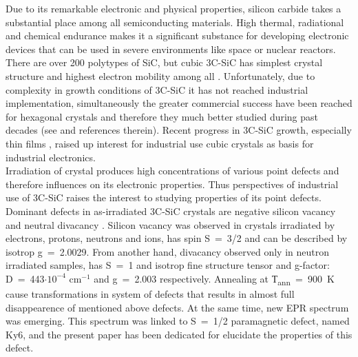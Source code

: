 Due to its remarkable electronic and physical properties, silicon carbide takes a substantial place among all semiconducting materials. High thermal, radiational and chemical endurance makes it a significant substance for developing electronic devices that can be used in severe environments like space or nuclear reactors.\\
\indent There are over 200 polytypes of SiC, but cubic 3C-SiC has simplest crystal structure and highest electron mobility among all \citep{choy1}. Unfortunately, due to complexity in growth conditions of 3C-SiC it has not reached industrial implementation, simultaneously the greater commercial success have been reached for hexagonal crystals and therefore they much better studied during past decades (see \citep{hex1, hex2} and references therein). Recent progress in 3C-SiC growth, especially thin films \citep{epilay}, raised up interest for industrial use cubic crystals as basis for industrial electronics.\\
\indent Irradiation of crystal produces high concentrations of various point defects and therefore influences on its electronic properties. Thus perspectives of industrial use of 3C-SiC raises the interest to studying properties of its point defects. Dominant defects in as-irradiated 3C-SiC crystals are negative silicon vacancy \citep{t1} and neutral divacancy \citep{ky5}. Silicon vacancy was observed in crystals irradiated by electrons, protons, neutrons and ions, has spin S~=~3/2 and can be described by isotrop g~=~2.0029. From another hand, divacancy observed only in neutron irradiated samples, has S~=~1 and isotrop fine structure tensor and g-factor: D~=~443$\cdot10^{-4}$ cm$^{-1}$ and g~=~2.003 respectively. Annealing at Т\textsubscript{ann}~=~900~K cause transformations in system of defects that results in almost full disappearence of mentioned above defects. At the same time, new EPR spectrum was emerging. This spectrum was linked to S~=~1/2 paramagnetic defect, named Ky6, and the present paper has been dedicated for elucidate the properties of this defect.
